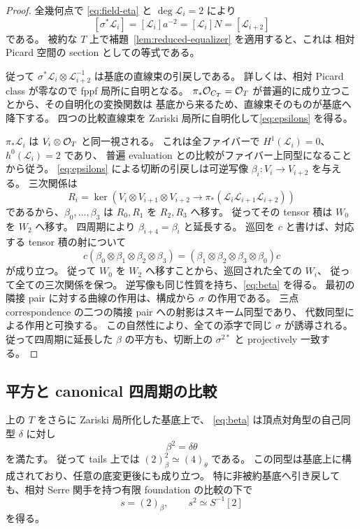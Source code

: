 \begin{proof}
全幾何点で \eqref{eq:field-eta} と $\deg\mathcal L_i=2$ により
\[
 [\sigma^*\mathcal L_i]=[\mathcal L_i]a^{-2}=[\mathcal L_i]N=[\mathcal L_{i+2}]
\]
である。
被約な $T$ 上で補題~\ref{lem:reduced-equalizer} を適用すると、これは
相対 Picard 空間の section としての等式である。

従って $\sigma^*\mathcal L_i\otimes\mathcal L_{i+2}^{-1}$ は基底の直線束の引戻しである。
詳しくは、相対 Picard class が零なので fppf 局所に自明となる。
$\pi_*\mathcal O_{C_T}=\mathcal O_T$ が普遍的に成り立つことから、その自明化の変換関数は
基底から来るため、直線束そのものが基底へ降下する。
四つの比較直線束を Zariski 局所に自明化して\eqref{eq:epsilons} を得る。

$\pi_*\mathcal L_i$ は $V_i\otimes\mathcal O_T$ と同一視される。
これは全ファイバーで $H^1(\mathcal L_i)=0$、$h^0(\mathcal L_i)=2$ であり、
普遍 evaluation との比較がファイバー上同型になることから従う。
\eqref{eq:epsilons} による切断の引戻しは可逆写像
$\beta_i:V_i\to V_{i+2}$ を与える。
三次関係は
\[
 R_i=\ker\left(V_i\otimes V_{i+1}\otimes V_{i+2}
   \longrightarrow\pi_*(\mathcal L_i\mathcal L_{i+1}\mathcal L_{i+2})\right)
\]
であるから、$\beta_0,\ldots,\beta_3$ は $R_0,R_1$ を $R_2,R_3$ へ移す。
従ってその tensor 積は $W_0$ を $W_2$ へ移す。
四周期により $\beta_{i+4}=\beta_i$ と延長する。
巡回を $c$ と書けば、対応する tensor 積の射について
\[
 c(\beta_0\otimes\beta_1\otimes\beta_2\otimes\beta_3)
  =(\beta_1\otimes\beta_2\otimes\beta_3\otimes\beta_0)c
\]
が成り立つ。
従って $W_0$ を $W_2$ へ移すことから、巡回された全ての $W_i$、
従って全ての三次関係を保つ。
逆写像も同じ性質を持ち、\eqref{eq:beta} を得る。
最初の隣接 pair に対する曲線の作用は、構成から $\sigma$ の作用である。
三点 correspondence の二つの隣接 pair への射影はスキーム同型であり、
代数同型による作用と可換する。
この自然性により、全ての添字で同じ $\sigma$ が誘導される。
従って四周期に延長した $\beta$ の平方も、切断上の $\sigma^{2*}$ と projectively 一致する。
\end{proof}

\subsection{平方と canonical 四周期の比較}

\begin{theorem}\label{thm:relative-compatible-root}
上の $T$ をさらに Zariski 局所化した基底上で、
\eqref{eq:beta} は頂点対角型の自己同型 $\delta$ に対し
\[
 \beta^2=\delta\theta
 \tag{PR-9}\label{eq:beta-square}
\]
を満たす。
従って tails 上では $(2)_\beta^2\simeq(4)_\theta$ である。
この同型は基底上に構成されており、任意の底変更後にも成り立つ。
特に非被約基底へ引き戻しても、相対 Serre 関手を持つ有限 foundation の比較の下で
\[
 s=(2)_\beta,\qquad s^2\simeq S^{-1}[2]
 \tag{PR-10}\label{eq:Serre-square}
\]
を得る。
\end{theorem}

